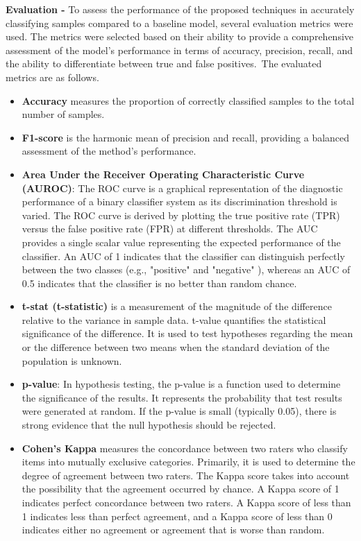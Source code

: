 \textbf{Evaluation - } To assess the performance of the proposed techniques in accurately classifying samples compared to a baseline model, several evaluation metrics were used. The metrics were selected based on their ability to provide a comprehensive assessment of the model's performance in terms of accuracy, precision, recall, and the ability to differentiate between true and false positives. The evaluated metrics are as follows.
\begin{itemize}
    \item \textbf{Accuracy} measures the proportion of correctly classified samples to the total number of samples. 
    \item \textbf{F1-score} is the harmonic mean of precision and recall, providing a balanced assessment of the method's performance. 
    \item \textbf{Area Under the Receiver Operating Characteristic Curve (AUROC)}: The ROC curve is a graphical representation of the diagnostic performance of a binary classifier system as its discrimination threshold is varied. The ROC curve is derived by plotting the true positive rate (TPR) versus the false positive rate (FPR) at different thresholds. The AUC provides a single scalar value representing the expected performance of the classifier. An AUC of 1 indicates that the classifier can distinguish perfectly between the two classes (e.g., "positive" and "negative" ), whereas an AUC of 0.5 indicates that the classifier is no better than random chance.
    \item \textbf{t-stat (t-statistic)} is a measurement of the magnitude of the difference relative to the variance in sample data. t-value quantifies the statistical significance of the difference. It is used to test hypotheses regarding the mean or the difference between two means when the standard deviation of the population is unknown.
    \item \textbf{p-value}: In hypothesis testing, the p-value is a function used to determine the significance of the results. It represents the probability that test results were generated at random. If the p-value is small (typically 0.05), there is strong evidence that the null hypothesis should be rejected.
    \item \textbf{Cohen's Kappa} measures the concordance between two raters who classify items into mutually exclusive categories. Primarily, it is used to determine the degree of agreement between two raters. The Kappa score takes into account the possibility that the agreement occurred by chance. A Kappa score of 1 indicates perfect concordance between two raters. A Kappa score of less than 1 indicates less than perfect agreement, and a Kappa score of less than 0 indicates either no agreement or agreement that is worse than random.

\end{itemize}
